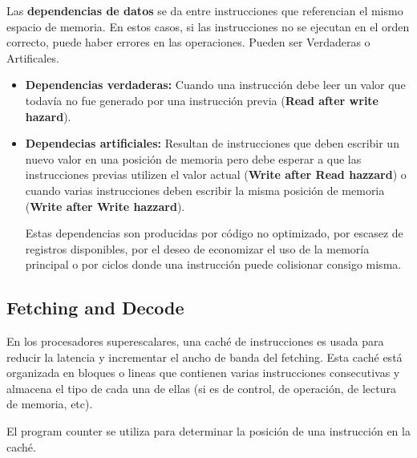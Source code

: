 Las \textbf{dependencias de datos} se da entre instrucciones que referencian el mismo espacio de memoria. En estos casos, si las instrucciones no se ejecutan en el orden correcto, puede haber errores en las operaciones. Pueden ser Verdaderas o Artificales.
\begin{itemize}
	\item \textbf{Dependencias verdaderas:} Cuando una instrucción debe leer un valor que todavía no fue generado por una instrucción previa (\textbf{Read after write hazard}).
	\item \textbf{Dependecias artificiales:} Resultan de instrucciones que deben escribir un nuevo valor en una posición de memoria pero debe esperar a que las instrucciones previas utilizen el valor actual (\textbf{Write after Read hazzard}) o cuando varias instrucciones deben escribir la misma posición de memoria (\textbf{Write after Write hazzard}).
	
	Estas dependencias son producidas por código no optimizado, por escasez de registros disponibles, por el deseo de economizar el uso de la memoría principal o por ciclos donde una instrucción puede colisionar consigo misma.
	
\end{itemize}


\subsection{Fetching and Decode}\label{ilp::superscalars::fetchDecode}
En los procesadores superescalares, una caché de instrucciones es usada para reducir la latencia y incrementar el ancho de banda del fetching. Esta caché está organizada en bloques o lineas que contienen varias instrucciones consecutivas y almacena el tipo de cada una de ellas (si es de control, de operación, de lectura de memoria, etc). 

El program counter se utiliza para determinar la posición de una instrucción en la caché.

